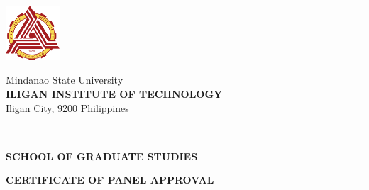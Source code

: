 \newpage
\thispagestyle{empty}







\begin{minipage}[t][-3.5cm][c]{2cm}
	\includegraphics[width = 2cm]{Figures/iit_logo.png}
\end{minipage}
\begin{minipage}[t][-2cm][c]{9.5cm}
	\begin{singlespace}
		Mindanao State University\\
		\textbf{ILIGAN INSTITUTE OF TECHNOLOGY}\\
		Iligan City, 9200 Philippines

			{\color{black}\rule{9.3cm}{1pt}}\\
		\textbf{SCHOOL OF GRADUATE STUDIES}\\
		\begin{center}
			\noindent \textbf{CERTIFICATE OF PANEL APPROVAL}
		\end{center}
	\end{singlespace}
\end{minipage}
\hfill
\hspace{1cm} %

